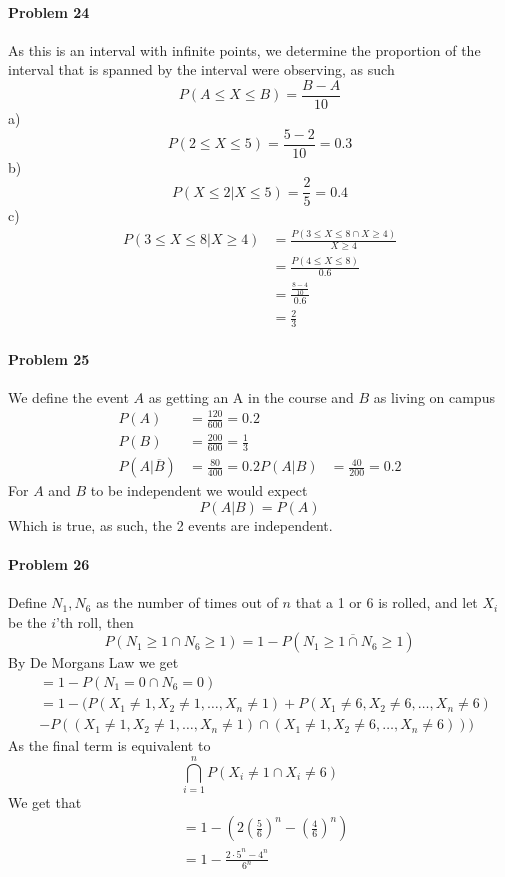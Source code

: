 \paragraph{Problem 24}
As this is an interval with infinite points, we determine the proportion of the interval that is spanned by the interval were observing, as such
\[
    P(A\leq X\leq B)=\frac{B-A}{10}
\]
a)
\[
    P(2\leq X\leq 5)=\frac{5-2}{10}=0.3
\]
b)
\[
    P(X\leq 2|X\leq 5)=\frac{2}{5}=0.4
\]
c)
\begin{align*}
    P(3\leq X\leq 8|X\geq 4)&=\frac{P(3\leq X\leq 8\cap X\geq 4)}{X\geq 4} \\
                   &=\frac{P(4\leq X\leq 8)}{0.6} \\
                   &=\frac{\frac{8-4}{10}}{0.6} \\
                   &=\frac{2}{3}
\end{align*}
\paragraph{Problem 25}
We define the event $A$ as getting an A in the course and $B$ as living on campus
\begin{align*}
    P(A)&=\frac{120}{600}=0.2 \\
    P(B)&=\frac{200}{600}=\frac{1}{3} \\
    P(A|\overline{B})&=\frac{80}{400}=0.2
    P(A|B)&=\frac{40}{200}=0.2
\end{align*}
For $A$ and $B$ to be independent we would expect
\[
    P(A|B)=P(A)
\]
Which is true, as such, the 2 events are independent.
\paragraph{Problem 26}
Define $N_1,N_6$ as the number of times out of $n$ that a 1 or 6 is rolled, and let $X_i$ be the $i$'th roll, then
\[
    P(N_1\geq 1\cap N_6\geq 1)=1-P(\overline{N_1\geq 1\cap N_6\geq 1})
\]
By De Morgans Law we get
\begin{align*}
    &=1-P(N_1=0\cap N_6=0) \\
    &=1-(P(X_1\neq 1,X_2\neq 1,\ldots,X_n\neq 1)+P(X_1\neq 6,X_2\neq 6,\ldots,X_n\neq 6) \\ 
    &-P((X_1\neq 1,X_2\neq 1,\ldots,X_n\neq 1)\cap (X_1\neq 1, X_2\neq 6,\ldots, X_n\neq 6))) 
\end{align*}
As the final term is equivalent to
\[
    \bigcap_{i=1}^{n} P(X_{i}\neq 1\cap X_{i}\neq 6)
\]
We get that
\begin{align*}
    &=1-\left(2\left(\frac{5}{6}\right)^{n}-\left(\frac{4}{6}\right)^{n}\right) \\
    &=1-\frac{2\cdot5^{n}-4^{n}}{6^{n}}
\end{align*}
